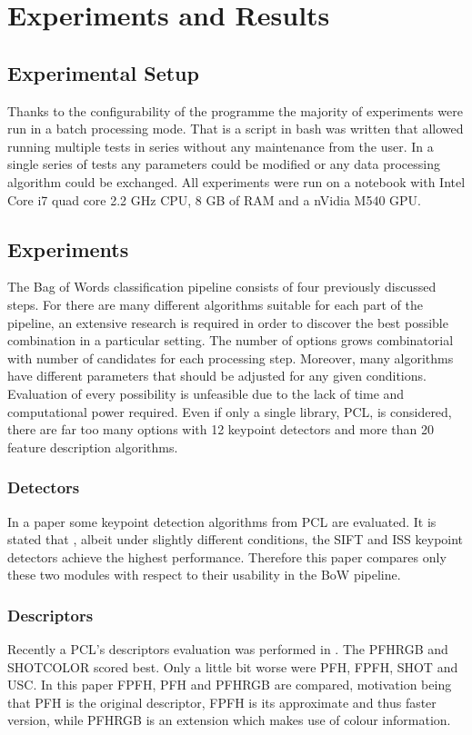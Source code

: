 \chapter{Experiments and Results}

\section{Experimental Setup}
	Thanks to the configurability of the programme the majority of experiments were run in a batch processing mode. That is a script in bash was written that allowed running multiple tests in series without any maintenance from the user. In a single series of tests any parameters could be modified or any data processing algorithm could be exchanged. All experiments were run on a notebook with Intel Core i7 quad core 2.2 GHz CPU, 8 GB of RAM and a nVidia M540 GPU.

\section{Experiments}
	The Bag of Words classification pipeline consists of four previously discussed steps. For there are many different algorithms suitable for each part of the pipeline, an extensive research is required in order to discover the best possible combination in a particular setting. The number of options grows combinatorial with number of candidates for each processing step. Moreover, many algorithms have different parameters that should be adjusted for any given conditions. Evaluation of every possibility is unfeasible due to the lack of time and computational power required. Even if only a single library, PCL, is considered, there are far too many options with 12 keypoint detectors and more than 20 feature description algorithms. 
	
	\subsection{Detectors}
	In a paper \cite{pcl_keypoint_comparision} some keypoint detection algorithms from PCL are evaluated. It is stated that , albeit under slightly different conditions, the SIFT and ISS keypoint detectors achieve the highest performance. Therefore this paper compares only these two modules with respect to their usability in the BoW pipeline. 

	\subsection{Descriptors}
	Recently a PCL's descriptors evaluation was performed in \cite{pcl_features}. The PFHRGB and SHOTCOLOR scored best. Only a little bit worse were PFH, FPFH, SHOT and USC. In this paper FPFH, PFH and PFHRGB are compared, motivation being that PFH is the original descriptor, FPFH is its approximate and thus faster version, while PFHRGB is an extension which makes use of colour information.
	
